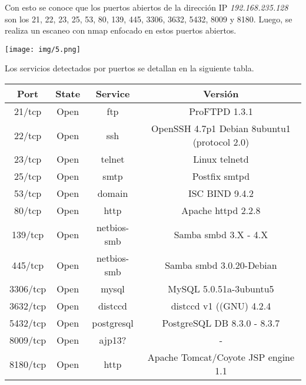 \documentclass[12pt,oneside,a4paper]{book}
\begin{document}
\vspace{1em}

\hspace{20pt}
Con esto se conoce que los puertos abiertos de la dirección IP \textit{192.168.235.128} son los 21, 22, 23, 25, 53, 80, 139, 445, 3306, 3632, 5432, 8009 y 8180. Luego, se realiza un escaneo con nmap enfocado en estos puertos abiertos.

\vspace{1em}

\begin{center}
    \texttt{[image: img/5.png]}
\end{center}

\vspace{1em}

\hspace{20pt}
Los servicios detectados por puertos se detallan en la siguiente tabla.

\vspace{1em}

\begin{table}[H]
    \centering
    \begin{tabular}{|c|c|c|c|}
         \hline
         \textbf{ Port } & \textbf{ State } & \textbf{ Service } & \textbf{ Versión } \\
         \hline
         21/tcp & Open  & ftp & ProFTPD 1.3.1 \\
         \hline
         22/tcp & Open  & ssh & OpenSSH 4.7p1 Debian 8ubuntu1 (protocol 2.0) \\
         \hline
         23/tcp & Open  & telnet & Linux telnetd \\
         \hline
         25/tcp & Open  & smtp & Postfix smtpd \\
         \hline
         53/tcp & Open  & domain & ISC BIND 9.4.2 \\
         \hline
         80/tcp & Open  & http & Apache httpd 2.2.8 \\
         \hline
         139/tcp & Open  & netbios-smb & Samba smbd 3.X - 4.X \\
         \hline
         445/tcp & Open  & netbios-smb & Samba smbd 3.0.20-Debian \\
         \hline
         3306/tcp & Open  & mysql & MySQL 5.0.51a-3ubuntu5 \\
         \hline
         3632/tcp & Open  & distccd & distccd v1 ((GNU) 4.2.4 \\
         \hline
         5432/tcp & Open  & postgresql & PostgreSQL DB 8.3.0 - 8.3.7 \\
         \hline
         8009/tcp & Open  & ajp13? & - \\
         \hline
         8180/tcp & Open  & http & Apache Tomcat/Coyote JSP engine 1.1 \\
         \hline
    \end{tabular}
\end{table}
\end{document}
